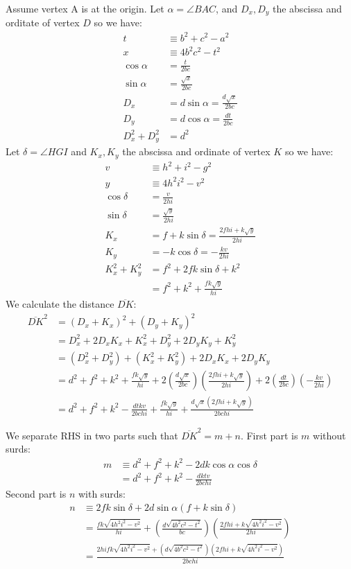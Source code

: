 \documentclass[11pt]{article}
\begin{document}
Assume vertex A is at the origin.
Let $\alpha = \angle{BAC}$, and $D_x,D_y$ the abscissa and orditate of vertex $D$ so we have:
\begin{align}
t &\equiv b^2 + c^2 - a^2\\
x &\equiv 4b^2c^2 - t^2\\
\cos\alpha &= \frac{t}{2bc}\\
\sin\alpha &= \frac{\sqrt{x}}{2bc}\\
D_x &= d\sin\alpha = \frac{d\sqrt{x}}{2bc}\\
D_y &= d\cos\alpha = \frac{dt}{2bc}\\
D_x^2 + D_y^2 &= d^2
\end{align}
Let $\delta = \angle{HGI}$ and $K_x,K_y$ the abscissa and ordinate of
vertex $K$ so we have:
\begin{align}
v &\equiv h^2 + i^2 - g^2\\
y &\equiv 4h^2i^2 - v^2\\
\cos\delta &= \frac{v}{2hi}\\
\sin\delta &= \frac{\sqrt{y}}{2hi}\\
K_x &= f + k\sin\delta = \frac{2fhi+ k\sqrt{y}}{2hi}\\
K_y &= -k\cos\delta = -\frac{kv}{2hi}\\
K_x^2 + K_y^2 &= f^2 + 2fk\sin\delta + k^2\\
 &= f^2+k^2 + \frac{fk\sqrt{y}}{hi}
\end{align}
We calculate the distance $\overline{DK}$:
\begin{align}
\overline{DK}^2 &= (D_x+K_x)^2 + (D_y+K_y)^2 \nonumber\\
 &= D_x^2 + 2D_xK_x + K_x^2 + D_y^2 + 2D_yK_y + K_y^2 \nonumber\\
 &= (D_x^2+D_y^2) + (K_x^2+K_y^2) + 2D_xK_x + 2D_yK_y \nonumber\\
 &= d^2 + f^2 + k^2 + \frac{fk\sqrt{y}}{hi}
  + 2\left(\frac{d\sqrt{x}}{2bc}\right)\left(\frac{2fhi+ k\sqrt{y}}{2hi}\right)
  + 2\left(\frac{dt}{2bc}\right)\left(-\frac{kv}{2hi}\right) \nonumber\\
 &= d^2 + f^2 + k^2 - \frac{dtkv}{2bchi} + \frac{fk\sqrt{y}}{hi} + \frac{d\sqrt{x}(2fhi+ k\sqrt{y})}{2bchi}
\end{align}






We separate RHS in two parts such that $\overline{DK}^2 = m + n$. First part is $m$ without surds:
\begin{align}
m &\equiv d^2 + f^2 + k^2 -2dk\cos\alpha\cos\delta \nonumber\\
 &= d^2 + f^2 + k^2 -\frac{dktv}{2bchi}
\end{align}
Second part is $n$ with surds:
\begin{align}
n &\equiv 2fk\sin\delta + 2d\sin\alpha(f + k\sin\delta) \nonumber\\
 &= \frac{fk\sqrt{4h^2i^2 - v^2}}{hi}
  + \left(\frac{d\sqrt{4b^2c^2 - t^2}}{bc}\right)\left(\frac{2fhi+k\sqrt{4h^2i^2 - v^2}}{2hi}\right) \nonumber\\
 &= \frac{2hifk\sqrt{4h^2i^2 - v^2} + (d\sqrt{4b^2c^2 - t^2})(2fhi+k\sqrt{4h^2i^2 - v^2})}{2bchi}\\
\end{align}
\end{document}
